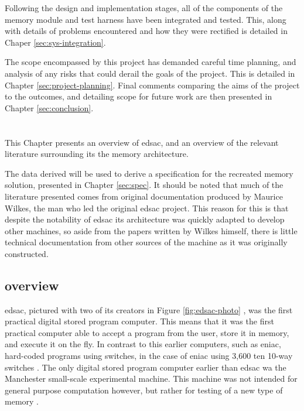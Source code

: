 Following the design and implementation stages, all of the components of the memory module and test harness have been integrated and tested. This, along with details of problems encountered and how they were rectified is detailed in Chaper \ref{sec:sys-integration}.

The scope encompassed by this project has demanded careful time planning, and analysis of any risks that could derail the goals of the project. This is detailed in Chapter \ref{sec:project-planning}. Final comments comparing the aims of the project to the outcomes, and detailing scope for future work are then presented in Chapter \ref{sec:conclusion}.

\chapter{} \label{sec:tech-rev}
This Chapter presents an overview of \gls{edsac}, and an overview of the relevant literature surrounding its the memory architecture.

The data derived will be used to derive a specification for the recreated memory solution, presented in Chapter \ref{sec:spec}. It should be noted that much of the literature presented comes from original documentation produced by Maurice Wilkes, the man who led the original \gls{edsac} project. This reason for this is that despite the notability of \gls{edsac} its architecture was quickly adapted to develop other machines, so aside from the papers written by Wilkes himself, there is little technical documentation from other sources of the machine as it was originally constructed.

\section{ overview} \label{sec:edsac-overview}
\Gls{edsac}, pictured with two of its creators in Figure \ref{fig:edsac-photo} \cite{cam2011}, was the first practical digital stored program computer. This means that it was the first practical computer able to accept a program from the user, store it in memory, and execute it on the fly. In contrast to this earlier computers, such as \gls{eniac}, hard-coded programs using switches, in the case of \gls{eniac} using 3,600 ten 10-way switches \cite{cruz2013}. The only digital stored program computer earlier than \gls{edsac} wa the Manchester small-scale experimental machine. This machine was not intended for general purpose computation however, but rather for testing of a new type of memory \cite{jones2001}.

